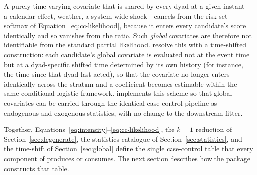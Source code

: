 A purely time-varying covariate that is shared by every dyad at a given
instant---a calendar effect, weather, a system-wide shock---cancels from
the risk-set softmax of Equation~\eqref{eq:cc-likelihood}, because it
enters every candidate's score identically and so vanishes from the
ratio. Such \emph{global} covariates are therefore not identifiable from
the standard partial likelihood. \citet{lembo2025} resolve this with a
time-shifted construction: each candidate's global covariate is evaluated
not at the event time but at a dyad-specific shifted time determined by
its own history (for instance, the time since that dyad last acted), so
that the covariate no longer enters identically across the stratum and a
coefficient becomes estimable within the same conditional-logistic
framework.  implements this scheme so that global covariates
can be carried through the identical case-control pipeline as endogenous
and exogenous statistics, with no change to the downstream fitter.

Together, Equations~\eqref{eq:intensity}--\eqref{eq:cc-likelihood}, the
$k=1$ reduction of Section~\ref{sec:degenerate}, the statistics catalogue
of Section~\ref{sec:statistics}, and the time-shift of
Section~\ref{sec:global} define the single case-control table that every
component of  produces or consumes. The next section describes
how the package constructs that table.
